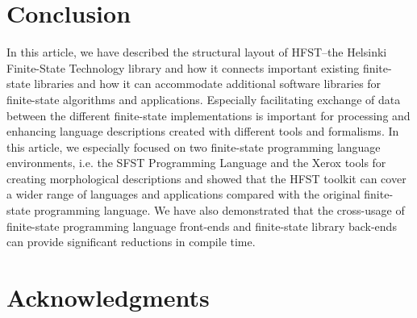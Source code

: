 \documentclass{llncs}
\begin{document}
\section{Conclusion}\label{hfst:conclusion}
In this article, we have described the structural layout of HFST--the Helsinki Finite-State Technology library
and how it connects important existing finite-state libraries and how it can accommodate additional software
libraries for finite-state algorithms and applications. Especially facilitating exchange of data between the different
finite-state implementations is important for processing and enhancing language descriptions created with different
tools and formalisms. In this article, we especially focused on two finite-state programming language environments, 
i.e. the SFST Programming Language and the Xerox tools for creating morphological descriptions and showed
that the HFST toolkit can cover a wider range of languages and applications compared with the original finite-state programming language. We have also demonstrated that the cross-usage of finite-state programming language 
front-ends and finite-state library back-ends can provide significant reductions in compile time.

\section*{Acknowledgments}



\end{document}
